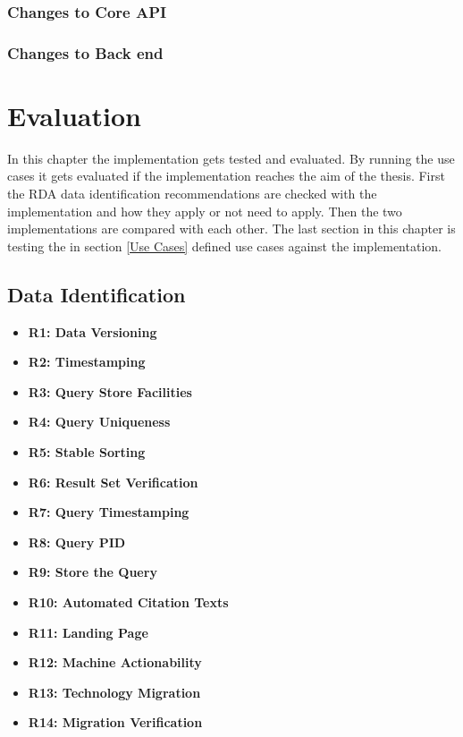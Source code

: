 \documentclass[draft,final]{vutinfth} %
\begin{document}
\subsection{Changes to Core API}
\subsection{Changes to Back end}

\chapter{Evaluation}\label{Evaluation}
In this chapter the implementation gets tested and evaluated. By running the use cases it gets evaluated if the implementation reaches the aim of the thesis. First the RDA data identification recommendations are checked with the implementation and how they apply or not need to apply. Then the two implementations are compared with each other. The last section in this chapter is testing the in section \ref{Use Cases} defined use cases against the implementation. 

\section{Data Identification}\label{Evaluation:Data Identification}
\begin{itemize}
	\item \textbf{R1: Data Versioning}
	\item \textbf{R2: Timestamping}
	\item \textbf{R3: Query Store Facilities}
	\item \textbf{R4: Query Uniqueness}
	\item \textbf{R5: Stable Sorting}
	\item \textbf{R6: Result Set Verification}
	\item \textbf{R7: Query Timestamping}
	\item \textbf{R8: Query PID}
	\item \textbf{R9: Store the Query}
	\item \textbf{R10: Automated Citation Texts}
	\item \textbf{R11: Landing Page}
	\item \textbf{R12: Machine Actionability}
	\item \textbf{R13: Technology Migration}
	\item \textbf{R14: Migration Verification}
\end{itemize}
\end{document}
